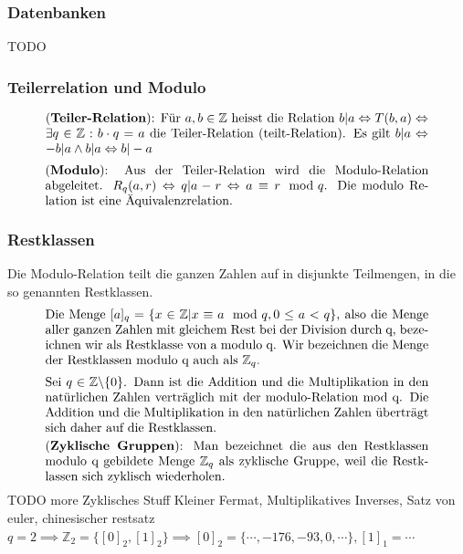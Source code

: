 \documentclass[../Main.tex]{subfiles}
\begin{document}
\subsubsection{Datenbanken}
TODO

\subsubsection{Teilerrelation und Modulo}
\begin{equation}
    \parbox{30em}{(\textbf{Teiler-Relation}): Für \(a,b \in \mathbb{Z}\) heisst die Relation 
    \(b|a \Leftrightarrow T(b,a) \Leftrightarrow \exists q \in \mathbb{Z}: b \cdot q = a \) die Teiler-Relation (teilt-Relation).
    Es gilt \(b|a \Leftrightarrow -b|a \land b|a \Leftrightarrow b|-a\)}
\end{equation}
\begin{equation}
    \parbox{30em}{(\textbf{Modulo}): Aus der Teiler-Relation wird die Modulo-Relation abgeleitet.
    \(R_q(a,r)\Leftrightarrow q|a-r \Leftrightarrow a \equiv r \mod q \). Die modulo Relation ist eine Äquivalenzrelation.}
\end{equation}
\subsubsection{Restklassen}
Die Modulo-Relation teilt die ganzen Zahlen auf in disjunkte Teilmengen, in die so genannten Restklassen.
\begin{equation}
    \parbox{30em}{Die Menge \([a]_q = \{x  \in \mathbb{Z} | x \equiv a \mod{q}, 0 \leq a < q\}\), also die 
    Menge aller ganzen Zahlen mit gleichem Rest bei der Division durch q, bezeichnen 
    wir als Restklasse von a modulo q. Wir bezeichnen die Menge der Restklassen 
    modulo q auch als \(\mathbb{Z}_q\).}
\end{equation}
\begin{equation}
    \parbox{30em}{Sei \(q \in \mathbb{Z} \backslash \{0\}\). Dann ist die Addition und die Multiplikation in den natürlichen Zahlen verträglich mit der modulo-Relation mod q. 
    Die Addition und die Multiplikation in den natürlichen Zahlen überträgt sich daher auf die Restklassen.}
\end{equation}
\begin{equation}
    \parbox{30em}{(\textbf{Zyklische Gruppen}): Man bezeichnet die aus den Restklassen modulo q gebildete Menge \(\mathbb{Z}_q\)
    als zyklische Gruppe, weil die Restklassen sich zyklisch wiederholen.}
\end{equation}
TODO more Zyklisches Stuff
Kleiner Fermat, Multiplikatives Inverses, Satz von euler, chinesischer restsatz
\(q = 2 \implies \mathbb{Z}_2 = \{[0]_2, [1]_2\} \implies [0]_2 = \{\cdots, -176, -93, 0, \cdots\}, [1]_1 = \cdots \)
\end{document}
